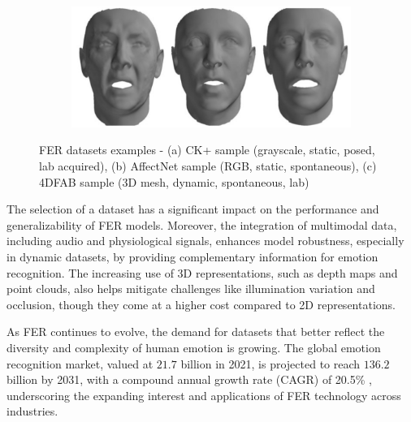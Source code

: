 \begin{figure}
\begin{subfigure}{0.2\textwidth}
		\caption{}
		\label{fig:subfigB}
	\end{subfigure}
   \hspace{0.1cm}
	\begin{subfigure}{0.45\textwidth}
        \includegraphics[width=\linewidth]{images/4DFAB_3D.png}
	        \caption{}
	        \label{fig:subfigC}
         \end{subfigure}
         \caption{FER datasets examples - (a) CK+\protect\cite{CK+} sample (grayscale, static, posed, lab acquired), (b) AffectNet\protect\cite{AffectNet} sample (RGB, static, spontaneous), (c) 4DFAB\protect\cite{4DFAB} sample (3D mesh, dynamic, spontaneous, lab)}
    \label{datasets_examples}
\end{figure}

The selection of a dataset has a significant impact on the performance and generalizability of FER models. Moreover, the integration of multimodal data, including audio and physiological signals, enhances model robustness, especially in dynamic datasets, by providing complementary information for emotion recognition. The increasing use of 3D representations, such as depth maps and point clouds, also helps mitigate challenges like illumination variation and occlusion, though they come at a higher cost compared to 2D representations.

As FER continues to evolve, the demand for datasets that better reflect the diversity and complexity of human emotion is growing. The global emotion recognition market, valued at $21.7$ billion in 2021, is projected to reach $136.2$ billion by 2031, with a compound annual growth rate (CAGR) of 20.5\% \cite{Allied-market-research}, underscoring the expanding interest and applications of FER technology across industries.




